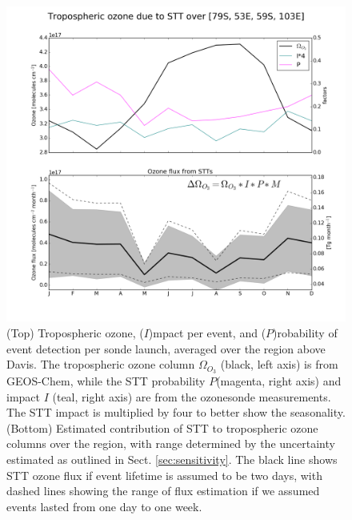\documentclass[acp, manuscript]{copernicus} %
\begin{document}
    
    \begin{figure}
      \includegraphics[width=12.0cm]{figures/STT_extrapolation_Dav.png}
      \caption{%
	(Top) Tropospheric ozone, ($I$)mpact per event, and ($P$)robability of event detection per sonde launch, averaged over the region above Davis.
	The tropospheric ozone column $\Omega_{O_3}$ (black, left axis) is from GEOS-Chem, while the STT probability  $P$(magenta, right axis) and impact $I$ (teal, right axis) are from the ozonesonde measurements.
	The STT impact is multiplied by four to better show the seasonality.
	(Bottom) Estimated contribution of STT to tropospheric ozone columns over the region, with range determined by the uncertainty estimated as outlined in Sect. \ref{sec:sensitivity}.
	The black line shows STT ozone flux if event lifetime is assumed to be two days, with dashed lines showing the range of flux estimation if we assumed events lasted from one day to one week.}
      \label{fig:DavExtrapolation}
    \end{figure}
    
\end{document}
